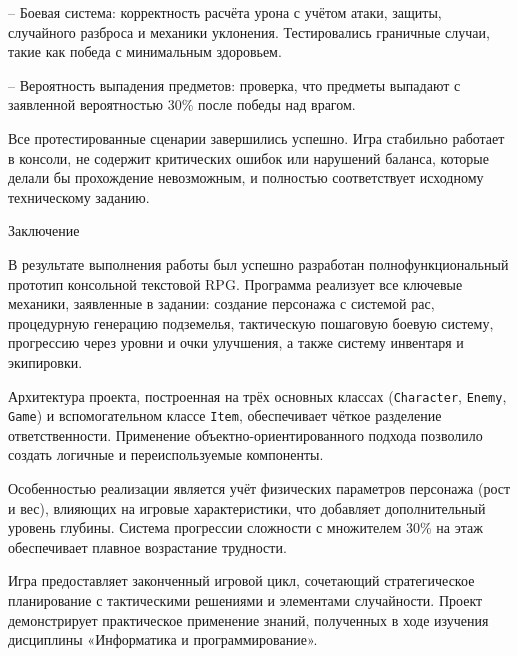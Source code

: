 \documentclass[]{vvsu}
\begin{document}
– Боевая система: корректность расчёта урона с учётом атаки, защиты, случайного разброса и механики уклонения. Тестировались граничные случаи, такие как победа с минимальным здоровьем.

– Вероятность выпадения предметов: проверка, что предметы выпадают с заявленной вероятностью 30\% после победы над врагом.

Все протестированные сценарии завершились успешно. Игра стабильно работает в консоли, не содержит критических ошибок или нарушений баланса, которые делали бы прохождение невозможным, и полностью соответствует исходному техническому заданию.

\newpage
\begin{center}
{\Large Заключение}
\end{center}
\vspace{1em}

В результате выполнения работы был успешно разработан полнофункциональный прототип консольной текстовой RPG. Программа реализует все ключевые механики, заявленные в задании: создание персонажа с системой рас, процедурную генерацию подземелья, тактическую пошаговую боевую систему, прогрессию через уровни и очки улучшения, а также систему инвентаря и экипировки.

Архитектура проекта, построенная на трёх основных классах (\texttt{Character}, \texttt{Enemy}, \texttt{Game}) и вспомогательном классе \texttt{Item}, обеспечивает чёткое разделение ответственности. Применение объектно-ориентированного подхода позволило создать логичные и переиспользуемые компоненты.

Особенностью реализации является учёт физических параметров персонажа (рост и вес), влияющих на игровые характеристики, что добавляет дополнительный уровень глубины. Система прогрессии сложности с множителем 30\% на этаж обеспечивает плавное возрастание трудности.

Игра предоставляет законченный игровой цикл, сочетающий стратегическое планирование с тактическими решениями и элементами случайности. Проект демонстрирует практическое применение знаний, полученных в ходе изучения дисциплины «Информатика и программирование».
\end{document}
